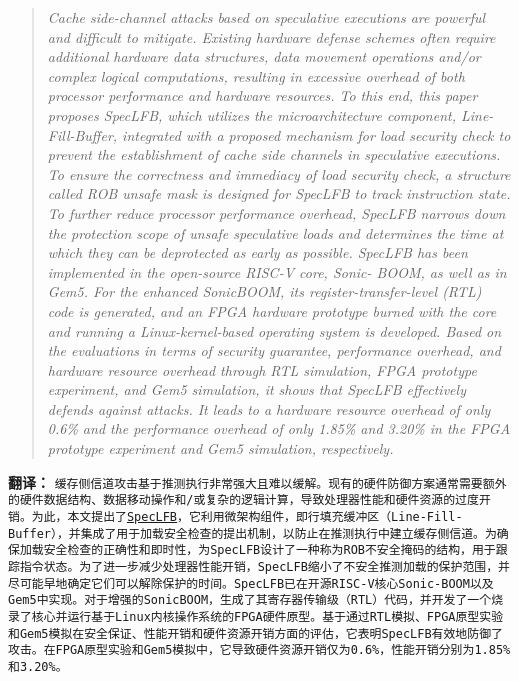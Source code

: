\documentclass[10pt]{article}
\begin{document}
  \begin{quotation}
    \textit{Cache side-channel attacks based on speculative executions
    are powerful and difficult to mitigate. Existing hardware defense
    schemes often require additional hardware data structures,
    data movement operations and/or complex logical computations,
    resulting in excessive overhead of both processor
    performance and hardware resources. To this end, this paper
    proposes SpecLFB, which utilizes the microarchitecture component,
    Line-Fill-Buffer, integrated with a proposed mechanism
    for load security check to prevent the establishment of
    cache side channels in speculative executions. To ensure the
    correctness and immediacy of load security check, a structure
    called ROB unsafe mask is designed for SpecLFB to track
    instruction state. To further reduce processor performance
    overhead, SpecLFB narrows down the protection scope of
    unsafe speculative loads and determines the time at which
    they can be deprotected as early as possible. SpecLFB has
    been implemented in the open-source RISC-V core, Sonic-
    BOOM, as well as in Gem5. For the enhanced SonicBOOM,
    its register-transfer-level (RTL) code is generated, and an
    FPGA hardware prototype burned with the core and running a
    Linux-kernel-based operating system is developed. Based on
    the evaluations in terms of security guarantee, performance
    overhead, and hardware resource overhead through RTL simulation,
    FPGA prototype experiment, and Gem5 simulation,
    it shows that SpecLFB effectively defends against attacks. It
    leads to a hardware resource overhead of only 0.6\% and the
    performance overhead of only 1.85\% and 3.20\% in the FPGA
    prototype experiment and Gem5 simulation, respectively.}
  \end{quotation}

  \begin{remark}\textbf{翻译：}
    \texttt{缓存侧信道攻击基于推测执行非常强大且难以缓解。现有的硬件防御方案通常需要额外的硬件数据结构、数据移动操作和/或复杂的逻辑计算，导致处理器性能和硬件资源的过度开销。为此，本文提出了\href{https://gitee.com/chip-security/SpecLFB}{SpecLFB}，它利用微架构组件，即行填充缓冲区（Line-Fill-Buffer），并集成了用于加载安全检查的提出机制，以防止在推测执行中建立缓存侧信道。为确保加载安全检查的正确性和即时性，为SpecLFB设计了一种称为ROB不安全掩码的结构，用于跟踪指令状态。为了进一步减少处理器性能开销，SpecLFB缩小了不安全推测加载的保护范围，并尽可能早地确定它们可以解除保护的时间。SpecLFB已在开源RISC-V核心Sonic-BOOM以及Gem5中实现。对于增强的SonicBOOM，生成了其寄存器传输级（RTL）代码，并开发了一个烧录了核心并运行基于Linux内核操作系统的FPGA硬件原型。基于通过RTL模拟、FPGA原型实验和Gem5模拟在安全保证、性能开销和硬件资源开销方面的评估，它表明SpecLFB有效地防御了攻击。在FPGA原型实验和Gem5模拟中，它导致硬件资源开销仅为0.6\%，性能开销分别为1.85\%和3.20\%。} 
    \end{remark}
    
\end{document}
